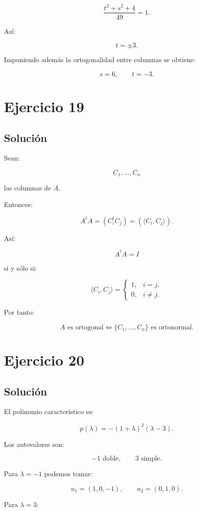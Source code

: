 \documentclass[11pt,a4paper]{article}
\begin{document}
\[
\frac{t^2+s^2+4}{49}=1.
\]

Así:

\[
t=\pm3.
\]

Imponiendo además la ortogonalidad entre columnas se obtiene:

\[
\boxed{
s=6,
\qquad
t=-3.
}
\]

\section{Ejercicio 19}
\subsection{Solución}

Sean:

\[
C_1,\ldots,C_n
\]

las columnas de $A$.

Entonces:

\[
A^tA
=
\left(
C_i^tC_j
\right)
=
\left(
\langle C_i,C_j\rangle
\right).
\]

Así:

\[
A^tA=I
\]

si y sólo si:

\[
\langle C_i,C_j\rangle
=
\begin{cases}
1,&i=j,\\
0,&i\neq j.
\end{cases}
\]

Por tanto:

\[
\boxed{
A\text{ es ortogonal}
\iff
\{C_1,\ldots,C_n\}
\text{ es ortonormal}.
}
\]

\section{Ejercicio 20}
\subsection{Solución}

El polinomio característico es:

\[
p(\lambda)
=
-(1+\lambda)^2(\lambda-3).
\]

Los autovalores son:

\[
-1\text{ doble},
\qquad
3\text{ simple}.
\]

Para $\lambda=-1$ podemos tomar:

\[
u_1=(1,0,-1),
\qquad
u_2=(0,1,0).
\]

Para $\lambda=3$:
\end{document}
